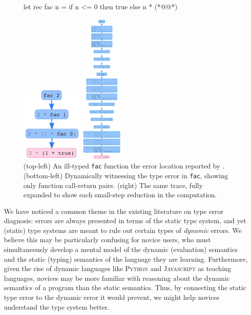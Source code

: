 \begin{figure}[t]
\centering
\begin{minipage}{.49\linewidth}
\centering
\begin{ecode}
  let rec fac n =
    if n <= 0 then
      true
    else
      n * (*@@*)
\end{ecode}
\vspace{2em}
\includegraphics[height=1.5in]{nanomaly/fac-overview.png}
\end{minipage}
\begin{minipage}{.49\linewidth}
\centering
\includegraphics[height=3in]{nanomaly/fac-long.png}
\end{minipage}
\vspace{1em}
\caption{(top-left) An ill-typed \texttt{fac} function  the error location reported by \ocaml. (bottom-left) Dynamically witnessing the type error in \texttt{fac}, showing only function call-return pairs. (right) The same trace, fully expanded to show each small-step reduction in the computation.}
\label{fig:factorial}
\end{figure}

We have noticed a common theme in the existing literature on type error
diagnosis: errors are always presented in terms of the static type
system, and yet (static) type systems are meant to rule out certain
types of \emph{dynamic} errors.
%
We believe this may be particularly confusing for novice users, who must
simultaneously develop a mental model of the dynamic (evaluation)
semantics and the static (typing) semantics of the language they are
learning.
%
Furthermore, given the rise of dynamic languages like \textsc{Python}
and \textsc{Javascript} as teaching languages, novices may be more
familiar with reasoning about the dynamic semantics of a program than
the static semantics.
%
Thus, by connecting the static type error to the dynamic error it
would prevent, we might help novices understand the type system better.

